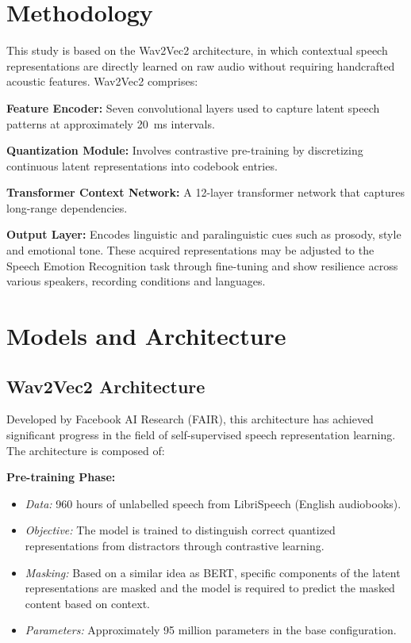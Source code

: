 \documentclass[conference]{IEEEtran}
\begin{document}
\section{Methodology}

This study is based on the Wav2Vec2 architecture, in which contextual speech representations
are directly learned on raw audio without requiring handcrafted acoustic features.
Wav2Vec2 comprises:

\smallskip
\noindent\textbf{Feature Encoder:} Seven convolutional layers used to capture latent speech
patterns at approximately 20~ms intervals.

\noindent\textbf{Quantization Module:} Involves contrastive pre-training by discretizing
continuous latent representations into codebook entries.

\noindent\textbf{Transformer Context Network:} A 12-layer transformer network that captures
long-range dependencies.

\noindent\textbf{Output Layer:} Encodes linguistic and paralinguistic cues such as prosody,
style and emotional tone. These acquired representations may be adjusted to the Speech
Emotion Recognition task through fine-tuning and show resilience across various speakers,
recording conditions and languages.

\section{Models and Architecture}

\subsection{Wav2Vec2 Architecture}

Developed by Facebook AI Research (FAIR), this architecture has achieved significant
progress in the field of self-supervised speech representation learning.
The architecture is composed of:

\smallskip
\noindent\textbf{Pre-training Phase:}
\begin{itemize}
  \item \textit{Data:} 960 hours of unlabelled speech from LibriSpeech (English audiobooks).
  \item \textit{Objective:} The model is trained to distinguish correct quantized
        representations from distractors through contrastive learning.
  \item \textit{Masking:} Based on a similar idea as BERT, specific components of the latent
        representations are masked and the model is required to predict the masked content
        based on context.
  \item \textit{Parameters:} Approximately 95 million parameters in the base configuration.
\end{itemize}
\end{document}
